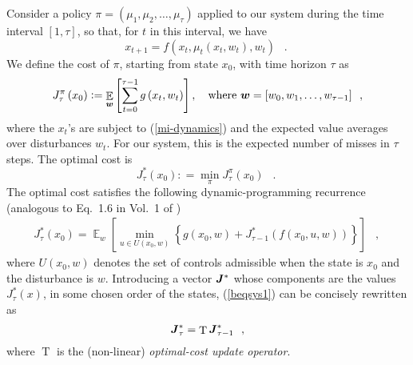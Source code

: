 \documentclass[11pt,a4paper]{article}
\DeclareMathOperator{\E}{\mathbb{E}}
\DeclareMathOperator{\T}{T}
\DeclareMathOperator{\mf}{\enspace .}
\DeclareMathOperator{\mc}{\enspace ,}
\newcommand{\deq}{\mathrel{\mathop:}=}
\theoremstyle{definition}
\theoremstyle{remark}
\def\vec#1{\mathchoice{\mbox{\boldmath$\displaystyle#1$}}
  {\mbox{\boldmath$\textstyle#1$}}
  {\mbox{\boldmath$\scriptstyle#1$}}
  {\mbox{\boldmath$\scriptscriptstyle#1$}}}
\begin{document}
Consider a policy $\pi=\left(\mu_1, \mu_2, \ldots, \mu_\tau\right)$
applied to our system during the time interval $\left[1,\tau \right]$,
so that, for $t$ in this interval, we have
\begin{equation}\label{mi-dynamics}
    x_{t+1}=f\left(x_t, \mu_t\left(x_t,w_t\right), w_t \right)\mf
\end{equation}
We define the cost of $\pi$, starting from state $x_0$, with time
horizon $\tau$ as
\begin{equation}\label{Jdef}
  J_\tau^\pi\left(x_0\right) \deq \E_{\vec w}\left[\sum_{t=0}^{\tau-1}
    g\left(x_t, w_t\right)\right], \quad \text{where } \vec w=\left[w_0, w_1,
    \ldots, w_{\tau-1} \right] \mc
\end{equation}
where the $x_t$'s are subject to (\ref{mi-dynamics}) and the expected value
averages over disturbances $w_t$. For our system, this is the expected number of
misses in $\tau$ steps. The optimal cost is
\begin{equation}
  J^*_\tau(x_0) \deq \min_\pi J_\tau^\pi\left(x_0\right) \mf
\end{equation}
The optimal cost satisfies the following dynamic-programming
recurrence (analogous to Eq.~1.6 in Vol.~1 of \cite{Bertsekas00})
\begin{equation}\label{beqsys1}
  \begin{split}
    J^*_\tau(x_0)=\E_w\left[\min_{u\in U(x_0,w)}\left\{g(
        x_0,w)+J^*_{\tau-1}\left(f\left(x_0,u,w\right)\right)\right\}\right]\mc
  \end{split}
\end{equation}
where $U(x_0,w)$ denotes the set of controls admissible when the state is $x_0$
and the disturbance is $w$.  Introducing a vector $\vec J^*$ whose components
are the values $J^*_{\tau}(x)$, in some chosen order of the states,
(\ref{beqsys1}) can be concisely rewritten as
\begin{equation}
  \vec J^*_\tau =\T \vec J^*_{\tau-1} \mc
\end{equation}
where $\T$ is the (non-linear) \emph{optimal-cost update operator}.
\end{document}
